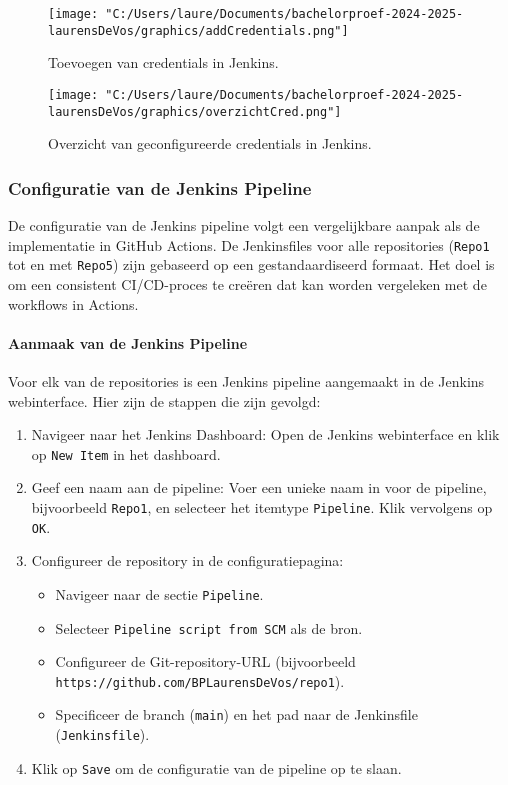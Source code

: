 \begin{figure}[h!]
    \centering
    \texttt{[image: "C:/Users/laure/Documents/bachelorproef-2024-2025-laurensDeVos/graphics/addCredentials.png"]}
    \caption{Toevoegen van credentials in Jenkins.}
    \label{fig:add_credentials}
\end{figure}

\begin{figure}[h!]
    \centering
    \texttt{[image: "C:/Users/laure/Documents/bachelorproef-2024-2025-laurensDeVos/graphics/overzichtCred.png"]}
    \caption{Overzicht van geconfigureerde credentials in Jenkins.}
    \label{fig:overview_credentials}
\end{figure}

\subsubsection{Configuratie van de Jenkins Pipeline}

De configuratie van de Jenkins pipeline volgt een vergelijkbare aanpak als de implementatie in GitHub Actions. De Jenkinsfiles voor alle repositories (\texttt{Repo1} tot en met \texttt{Repo5}) zijn gebaseerd op een gestandaardiseerd formaat. Het doel is om een consistent CI/CD-proces te creëren dat kan worden vergeleken met de workflows in Actions.

\paragraph{Aanmaak van de Jenkins Pipeline}

Voor elk van de repositories is een Jenkins pipeline aangemaakt in de Jenkins webinterface. Hier zijn de stappen die zijn gevolgd:

\begin{enumerate} 
    \item Navigeer naar het Jenkins Dashboard:
    Open de Jenkins webinterface en klik op \texttt{New Item} in het dashboard.
    \item Geef een naam aan de pipeline:  
    Voer een unieke naam in voor de pipeline, bijvoorbeeld \texttt{Repo1}, en selecteer het itemtype \texttt{Pipeline}. Klik vervolgens op \texttt{OK}.
    
    \item Configureer de repository in de configuratiepagina:
    \begin{itemize}
        \item Navigeer naar de sectie \texttt{Pipeline}.
        \item Selecteer \texttt{Pipeline script from SCM} als de bron.
        \item Configureer de Git-repository-URL (bijvoorbeeld \texttt{https://github.com/BPLaurensDeVos/repo1}).
        \item Specificeer de branch (\texttt{main}) en het pad naar de Jenkinsfile (\texttt{Jenkinsfile}).
    \end{itemize}
    
    \item Klik op \texttt{Save} om de configuratie van de pipeline op te slaan.
\end{enumerate}   

